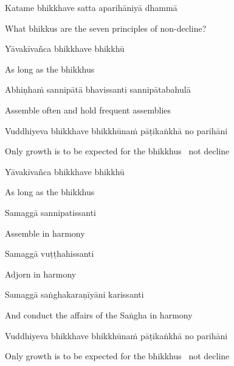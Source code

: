 \begin{leader}
\end{leader}

Katame bhikkhave satta aparihāniyā dhammā

\begin{cprenglish}
  What bhikkus are the seven principles of non-decline?
\end{cprenglish}

Yāvakīvañca bhikkhave bhikkhū

\begin{cprenglish}
  As long as the bhikkhus
\end{cprenglish}

Abhiṇhaṁ sannipātā bhavissanti sannipātabahulā

\begin{cprenglish}
  Assemble often and hold frequent assemblies
\end{cprenglish}

Vuddhiyeva bhikkhave bhikkhūnaṁ pāṭikaṅkhā no parihāni

\begin{cprenglish}
  Only growth is to be expected for the bhikkhus \breathmark\ not decline
\end{cprenglish}

Yāvakīvañca bhikkhave bhikkhū

\begin{cprenglish}
  As long as the bhikkhus
\end{cprenglish}

Samaggā sannipatissanti

\begin{cprenglish}
  Assemble in harmony
\end{cprenglish}

Samaggā vuṭṭhahissanti

\begin{cprenglish}
  Adjorn in harmony
\end{cprenglish}

Samaggā saṅghakaraṇīyāni karissanti

\begin{cprenglish}
  And conduct the affairs of the Saṅgha in harmony
\end{cprenglish}

Vuddhiyeva bhikkhave bhikkhūnaṁ pāṭikaṅkhā no parihāni

\begin{cprenglish}
  Only growth is to be expected for the bhikkhus \breathmark\ not decline
\end{cprenglish}

